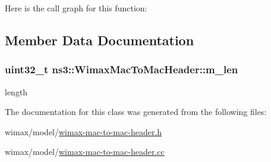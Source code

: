 Here is the call graph for this function\+:




\subsection{Member Data Documentation}
\subsubsection[{\texorpdfstring{m\+\_\+len}{m_len}}]{\setlength{\rightskip}{0pt plus 5cm}uint32\+\_\+t ns3\+::\+Wimax\+Mac\+To\+Mac\+Header\+::m\+\_\+len\hspace{0.3cm}{\ttfamily [private]}}\hypertarget{classns3_1_1WimaxMacToMacHeader_ae00de1c6c413ab383c21d1386799ab1c}{}\label{classns3_1_1WimaxMacToMacHeader_ae00de1c6c413ab383c21d1386799ab1c}


length 



The documentation for this class was generated from the following files\+:\begin{DoxyCompactItemize}
\item 
wimax/model/\hyperlink{wimax-mac-to-mac-header_8h}{wimax-\/mac-\/to-\/mac-\/header.\+h}\item 
wimax/model/\hyperlink{wimax-mac-to-mac-header_8cc}{wimax-\/mac-\/to-\/mac-\/header.\+cc}\end{DoxyCompactItemize}
